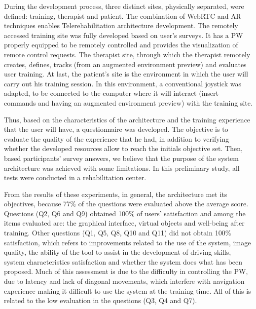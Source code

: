 During the development process, three distinct sites, physically separated, were defined: training, therapist and patient. The combination of WebRTC and AR techniques enables Telerehabilitation architecture development. The remotely accessed training site was fully developed based on user's surveys. It has a PW properly equipped to be remotely controlled and provides the visualization of remote control requests. The therapist site, through which the therapist remotely creates, defines, tracks (from an augmented environment preview) and evaluates user training. At last, the patient's site is the environment in which the user will carry out his training session. In this environment, a conventional joystick was adapted, to be connected to the computer where it will interact (insert commands and having an augmented environment preview) with the training site.

Thus, based on the characteristics of the architecture and the training experience that the user will have, a questionnaire was developed. The objective is to evaluate the quality of the experience that he had, in addition to verifying whether the developed resources allow to reach the initials objective set. Then, based participants' survey answers, we believe that the purpose of the system architecture was achieved with some limitations. In this preliminary study, all tests were conducted in a rehabilitation center. 

From the results of these experiments, in general, the architecture met its objectives, because 77\% of the questions were evaluated above the average score. Questions (Q2, Q6 and Q9) obtained 100\% of users' satisfaction and among the items evaluated are: the graphical interface, virtual objects and well-being after training. Other questions (Q1, Q5, Q8, Q10 and Q11) did not obtain 100\% satisfaction, which refers to improvements related to the use of the system, image quality, the ability of the tool to assist in the development of driving skills, system characteristics satisfaction and whether the system does what has been proposed. Much of this assessment is due to the difficulty in controlling the PW, due to latency and lack of diagonal movements, which interfere with navigation experience making it difficult to use the system at the training time. All of this is related to the low evaluation in the questions (Q3, Q4 and Q7).

